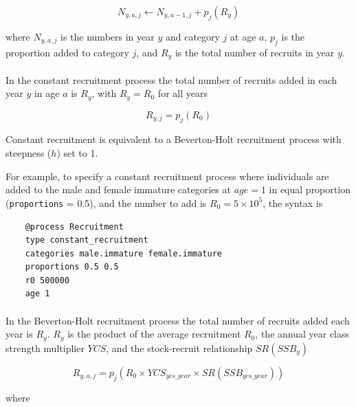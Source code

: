 \begin{equation}
N_{y,a,j} \leftarrow N_{y,a - 1,j} + p_j(R_y)
\end{equation}

where $N_{y,a,j}$ is the numbers in year $y$ and category $j$ at age $a$, $p_j$ is the proportion added to category $j$, and $R_y$ is the total number of recruits in year $y$.

\paragraph{}\label{subsubsec:constant-recruitment}

In the constant recruitment process the total number of recruits added in each year $y$ in age $a$ is $R_y$, with $R_y = R_0$ for all years

\begin{equation}
  R_{y,j} = p_j(R_0)
\end{equation}

Constant recruitment is equivalent to a Beverton-Holt recruitment process with steepness ($h$) set to 1.

For example, to specify a constant recruitment process where individuals are added to the male and female immature categories at $age=1$ in equal proportion (\texttt{proportions} = 0.5), and the number to add is $R_0=5 \times 10^5$, the syntax is

{\small{\begin{verbatim}
	@process Recruitment
	type constant_recruitment
	categories male.immature female.immature
	proportions 0.5 0.5
	r0 500000
	age 1
\end{verbatim}}}

\paragraph{}\label{subsubsec:BH-recruitment}

In the Beverton-Holt recruitment process the total number of recruits added each year is $R_y$. $R_y$ is the product of the average recruitment $R_0$, the annual year class strength multiplier $YCS$, and the stock-recruit relationship $SR(SSB_y)$

\begin{equation}\label{eq:BH}
  R_{y,a,j} = p_j(R_0 \times YCS_{ycs\_year} \times SR(SSB_{ycs\_year}))
\end{equation}

where

